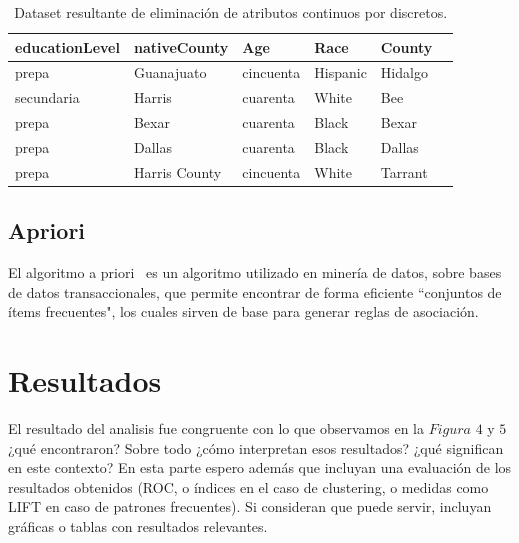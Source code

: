 \documentclass[sigconf]{acmart}
\begin{document}
\begin{table}[!hbt]
\begin{center}
\begin{tabular}{llllll}
\toprule
educationLevel &   nativeCounty &        Age &      Race &   County \\
\midrule
         prepa &     Guanajuato &  cincuenta &  Hispanic &  Hidalgo \\
     secundaria &         Harris &   cuarenta &     White &      Bee \\
         prepa &          Bexar &   cuarenta &     Black &    Bexar \\
         prepa &         Dallas &   cuarenta &     Black &   Dallas \\
        prepa &  Harris County &  cincuenta &     White &  Tarrant \\
\bottomrule
\end{tabular}
\caption{Dataset resultante de eliminación de atributos continuos por discretos.}
\end{center}
\end{table}

\subsection{Apriori} 
El algoritmo a priori~\cite{Raschka-rules} es un algoritmo utilizado en minería de datos, sobre bases de datos transaccionales, que permite encontrar de forma eficiente ``conjuntos de ítems frecuentes", los cuales sirven de base para generar reglas de asociación.


\section{Resultados}
El resultado del analisis fue congruente con lo que observamos en la $Figura$ $4$ y $5$
¿qué encontraron? Sobre todo ¿cómo interpretan esos resultados? ¿qué significan en este contexto?  En esta parte espero además que incluyan una evaluación de los resultados obtenidos (ROC, o índices en el caso de clustering, o medidas como LIFT en caso de patrones frecuentes).  Si consideran que puede servir, incluyan gráficas o tablas con resultados relevantes. 
\end{document}
